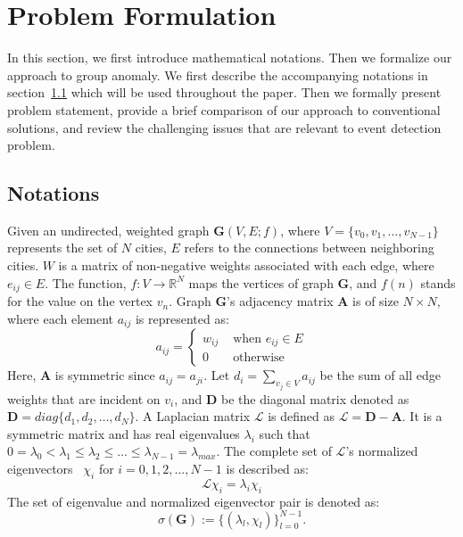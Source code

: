 \section{Problem Formulation}
\label{sec:problem}
In this section, we first introduce mathematical notations. Then we formalize our approach to group anomaly.
We first describe the accompanying notations in section~\ref{sec:notations} which will be used throughout the paper.
Then we formally present problem statement, provide a brief comparison of our approach to conventional solutions, and review the challenging issues that are relevant to event detection problem.
\subsection{Notations}
\label{sec:notations}
Given an undirected, weighted graph $\mathbf{G}(V,E;f)$, where $V=\{v_0,v_1,...,v_{N-1}\}$ represents the set of $N$ cities, $E$ refers to the connections between neighboring cities. $W$ is a matrix of non-negative weights associated with each edge, where $e_{ij}\in E$. The function, $f: V \rightarrow {\mathbb{R}}^N$ maps the vertices of graph $\mathbf{G}$, and $f(n)$ stands for the value on the vertex $v_n$. Graph $\mathbf{G}$'s adjacency matrix $\mathbf{A}$ is of size $N\times N$, where each element $a_{ij}$ is represented as:
\begin{equation}
a_{ij} = \left\{ \begin{array}{rl}
 w_{ij} &\mbox{ when $e_{ij}\in {E}$} \\
  0 &\mbox{ otherwise}
       \end{array} \right.
\end{equation}
Here, $\mathbf{A}$ is symmetric since $a_{ij}=a_{ji}$.
Let $d_i=\sum\limits_{v_j \in V}a_{ij}$ be the sum of all edge weights that are incident on $v_i$, and $\mathbf{D}$ be the diagonal matrix denoted as $\mathbf{D}=diag\{d_1,d_2,\ldots,d_N\}$. A Laplacian matrix $\mathcal{L}$ is defined as $\mathcal{L}=\mathbf{D-A}$. It is a symmetric matrix and has real eigenvalues $\lambda_{i}$ such that $0 = \lambda_{0} < \lambda_{1} \leq \lambda_{2} \leq \ldots \leq \lambda_{N-1} = \lambda_{max}$. The complete set of $\mathcal{L}$'s normalized eigenvectors~\cite{bapat2010graphs} $\chi_{i}$ for $i=0,1,2,...,N-1$ is described as:
\begin{equation}
\label{eq:eigenvalues}
\mathcal{L}\chi_{i}=\lambda_{i}\chi_{i}
\end{equation}
The set of eigenvalue and normalized eigenvector pair is denoted as:
\begin{equation}
\label{eq:eigenvalues}
\sigma({\mathbf{G}}):=\{(\lambda_l,\chi_l)\}_{l=0}^{N-1}.
\end{equation}





